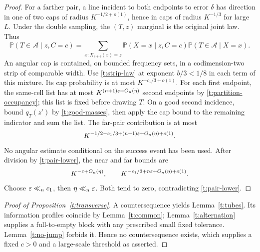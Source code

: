 \begin{proof}
For a farther pair, a line incident to both endpoints to error $\delta$
has direction in one of two caps of radius $K^{-1/2+o(1)}$, hence in
caps of radius $K^{-1/3}$ for large $L$.  Under the double sampling,
the $(T,z)$ marginal is the original joint law.  Thus
\begin{equation}\label{t:posterior-law}
 \mathbb P(T\in\mathcal A\mid z,C=c)
 =\sum_{x:X_{s+b}(x)=z}\mathbb P(X=x\mid z,C=c)
                       \mathbb P(T\in\mathcal A\mid X=x).
\end{equation}
An angular cap is contained, on bounded frequency sets, in a
codimension-two strip of comparable width.  Use \eqref{t:strip-law}
at exponent $b/3<1/8$ in each term of this mixture.  Its cap probability
is at most $K^{-c_1/3+o(1)}$.
For each first endpoint, the same-cell list has at most
$K^{(n+1)\varepsilon+O_n(\eta)}$ second endpoints by
\eqref{t:partition-occupancy}; this list is fixed before drawing $T$.
On a good second incidence, bound $q_T(z')$ by
\eqref{t:good-masses}, then apply the cap bound to the remaining
indicator and sum the list.  The far-pair contribution is at most
\[
 K^{-1/2-c_1/3+(n+1)\varepsilon+O_n(\eta)+o(1)}.
\]
No angular estimate conditional on the success event has been used.
After division by \eqref{t:pair-lower}, the near and far bounds are
\[
 K^{-\varepsilon+O_n(\eta)},\qquad
 K^{-c_1/3+n\varepsilon+O_n(\eta)+o(1)}.
\]
Choose $\varepsilon\ll_n c_1$, then $\eta\ll_n\varepsilon$.  Both tend to zero,
contradicting \eqref{t:pair-lower}.
\end{proof}

\begin{proof}[Proof of Proposition~\ref{t:transverse}]
A countersequence yields Lemma~\ref{t:tubes}.  Its information profiles
coincide by Lemma~\ref{t:common}; Lemma~\ref{t:alternation} supplies
a full-to-empty block with any prescribed small fixed tolerance.
Lemma~\ref{t:no-jump} forbids it.  Hence no countersequence exists,
which supplies a fixed $c>0$ and a large-scale threshold as asserted.
\end{proof}
